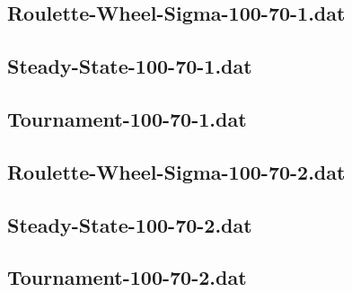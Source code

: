 \documentclass[titlepage, a4paper, 12pt]{article}
\begin{document}
\subsection{Roulette-Wheel-Sigma-100-70-1.dat}\label{Roulette-Wheel-Sigma-100-70-1.dat}
\begin{footnotesize}
  
\end{footnotesize}

\subsection{Steady-State-100-70-1.dat}\label{Steady-State-100-70-1.dat}
\begin{footnotesize}
  
\end{footnotesize}

\subsection{Tournament-100-70-1.dat}\label{Tournament-100-70-1.dat}
\begin{footnotesize}
  
\end{footnotesize}

\subsection{Roulette-Wheel-Sigma-100-70-2.dat}\label{Roulette-Wheel-Sigma-100-70-2.dat}
\begin{footnotesize}
  
\end{footnotesize}

\subsection{Steady-State-100-70-2.dat}\label{Steady-State-100-70-2.dat}
\begin{footnotesize}
  
\end{footnotesize}

\subsection{Tournament-100-70-2.dat}\label{Tournament-100-70-2.dat}
\begin{footnotesize}
  
\end{footnotesize}
\end{document}
